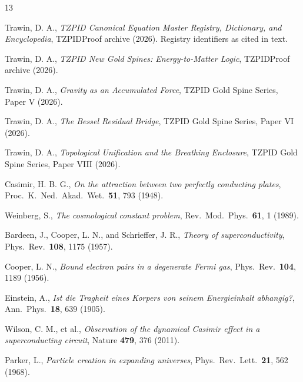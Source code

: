 \documentclass[11pt]{article}
\theoremstyle{remark}
\begin{document}
\begin{thebibliography}{13}

 Trawin, D. A., \emph{TZPID Canonical Equation Master Registry, Dictionary, and Encyclopedia}, TZPIDProof archive (2026). Registry identifiers as cited in text.

 Trawin, D. A., \emph{TZPID New Gold Spines: Energy-to-Matter Logic}, TZPIDProof archive (2026).

 Trawin, D. A., \emph{Gravity as an Accumulated Force}, TZPID Gold Spine Series, Paper V (2026).

 Trawin, D. A., \emph{The Bessel Residual Bridge}, TZPID Gold Spine Series, Paper VI (2026).

 Trawin, D. A., \emph{Topological Unification and the Breathing Enclosure}, TZPID Gold Spine Series, Paper VIII (2026).

 Casimir, H. B. G., \emph{On the attraction between two perfectly conducting plates}, Proc.\ K.\ Ned.\ Akad.\ Wet.\ \textbf{51}, 793 (1948).

 Weinberg, S., \emph{The cosmological constant problem}, Rev.\ Mod.\ Phys.\ \textbf{61}, 1 (1989).

 Bardeen, J., Cooper, L. N., and Schrieffer, J. R., \emph{Theory of superconductivity}, Phys.\ Rev.\ \textbf{108}, 1175 (1957).

 Cooper, L. N., \emph{Bound electron pairs in a degenerate Fermi gas}, Phys.\ Rev.\ \textbf{104}, 1189 (1956).

 Einstein, A., \emph{Ist die Tragheit eines Korpers von seinem Energieinhalt abhangig?}, Ann.\ Phys.\ \textbf{18}, 639 (1905).

 Wilson, C. M., et al., \emph{Observation of the dynamical Casimir effect in a superconducting circuit}, Nature \textbf{479}, 376 (2011).

 Parker, L., \emph{Particle creation in expanding universes}, Phys.\ Rev.\ Lett.\ \textbf{21}, 562 (1968).

\end{thebibliography}
\end{document}
